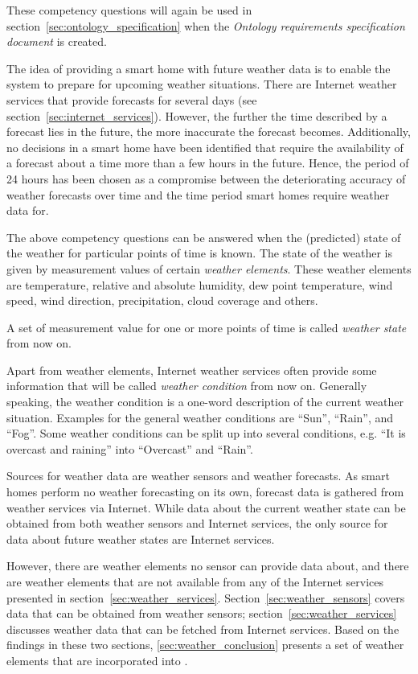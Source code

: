These competency questions will again be used in section~\ref{sec:ontology_specification} when the \emph{Ontology requirements specification document} is created.

The idea of providing a smart home with future weather data is to enable the system to prepare for upcoming weather situations. There are Internet weather services that provide forecasts for several days (see section~\ref{sec:internet_services}). However, the further the time described by a forecast lies in the future, the more inaccurate the forecast becomes\cite{forecast_error1,forecast_error2}. Additionally, no decisions in a smart home have been identified that require the availability of a forecast about a time more than a few hours in the future. Hence, the period of 24 hours has been chosen as a compromise between the deteriorating accuracy of weather forecasts over time and the time period smart homes require weather data for.

The above competency questions can be answered when the (predicted) state of the weather for particular points of time is known. The state of the weather is given by measurement values of certain \emph{weather elements}. These weather elements are temperature, relative and absolute humidity, dew point temperature, wind speed, wind direction, precipitation, cloud coverage and others.\cite{GlossaryOfMeteorology}

A set of measurement value for one or more points of time is called \emph{weather state} from now on.

Apart from weather elements, Internet weather services often provide some information that will be called \emph{weather condition} from now on. Generally speaking, the weather condition is a one-word description of the current weather situation. Examples for the general weather conditions are ``Sun'', ``Rain'', and ``Fog''. Some weather conditions can be split up into several conditions, e.g. ``It is overcast and raining'' into ``Overcast'' and ``Rain''.

Sources for weather data are weather sensors and weather forecasts. As smart homes perform no weather forecasting on its own, forecast data is gathered from weather services via Internet. While data about the current weather state can be obtained from both weather sensors and Internet services, the only source for data about future weather states are Internet services.

However, there are weather elements no sensor can provide data about, and there are weather elements that are not available from any of the Internet services presented in section~\ref{sec:weather_services}. Section~\ref{sec:weather_sensors} covers data that can be obtained from weather sensors; section~\ref{sec:weather_services} discusses weather data that can be fetched from Internet services. Based on the findings in these two sections, \ref{sec:weather_conclusion} presents a set of weather elements that are incorporated into \smarthomeweather.

